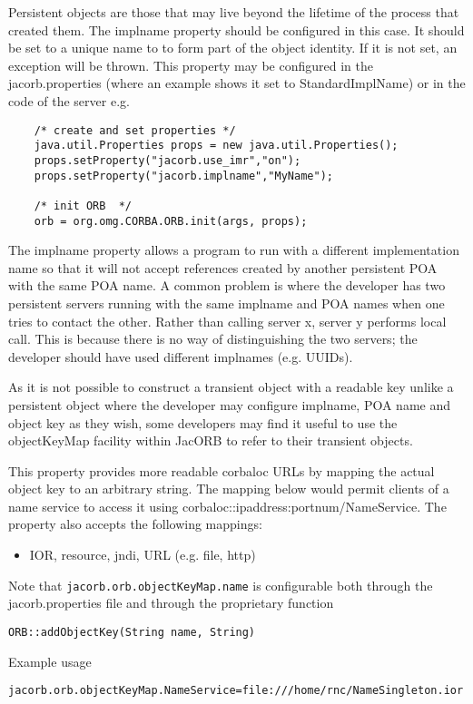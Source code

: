{{Persistent objects are those that may live beyond the lifetime of the process that created them. The implname property should be configured in this case. It should be set to a unique name to to form part of the object identity. If it is not set, an exception will be thrown. This property may be configured in the jacorb.properties (where an example shows it set to StandardImplName) or in the code of the server e.g.
\small{
\begin{verbatim}
    /* create and set properties */
    java.util.Properties props = new java.util.Properties();
    props.setProperty("jacorb.use_imr","on");
    props.setProperty("jacorb.implname","MyName");

    /* init ORB  */
    orb = org.omg.CORBA.ORB.init(args, props);
\end{verbatim}
}

The implname property allows a program to run with a different implementation name so that it will not accept references created by another persistent POA with the same POA name. A common problem is where the developer has two persistent servers running with the same implname and POA names when one tries to contact the other. Rather than calling server x, server y performs local call. This is because there is no way of distinguishing the two servers; the developer should have used different implnames (e.g. UUIDs).

As it is not possible to construct a transient object with a readable key unlike a persistent object where the developer may configure implname, POA name and object key as they wish, some developers may find it useful to use the objectKeyMap facility within JacORB to refer to their transient objects.

This property provides more readable corbaloc URLs by mapping the actual object key to an arbitrary string. The mapping below would permit clients of a name service to access it using corbaloc::ipaddress:portnum/NameService. The property also accepts the following mappings:
\begin{itemize}
\item IOR, resource, jndi, URL (e.g. file, http)
\end{itemize}
Note that {\tt jacorb.orb.objectKeyMap.name} is configurable both through the jacorb.properties file and through the proprietary function

{\tt ORB::addObjectKey(String name, String)}

Example usage

{\tt jacorb.orb.objectKeyMap.NameService=file:///home/rnc/NameSingleton.ior}

}}
